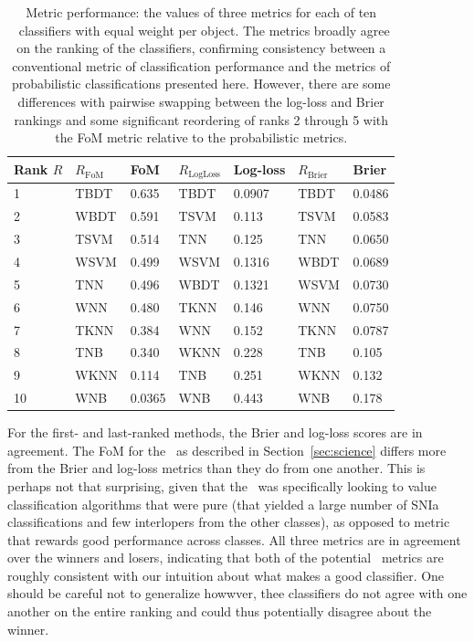 \begin{table}[]
	\begin{centering}
\begin{tabular}{lllllll}%
Rank $R$ & $R_\mathrm{FoM}$ & FoM & %
$R_\mathrm{LogLoss}$ & Log-loss & $R_\mathrm{Brier}$ & Brier \\
\hline
1  & TBDT & 0.635  %
& TBDT & 0.0907 & TBDT & 0.0486 \\
2  & WBDT & 0.591  %
& TSVM & 0.113  & TSVM & 0.0583 \\
3  & TSVM & 0.514  %
& TNN  & 0.125  & TNN  & 0.0650 \\
4  & WSVM & 0.499  %
& WSVM & 0.1316 & WBDT & 0.0689 \\
5  & TNN  & 0.496  %
& WBDT & 0.1321 & WSVM & 0.0730 \\
6  & WNN  & 0.480  %
& TKNN & 0.146  & WNN  & 0.0750 \\
7  & TKNN & 0.384  %
& WNN  & 0.152  & TKNN & 0.0787 \\
8  & TNB  & 0.340  %
& WKNN & 0.228  & TNB  & 0.105  \\
9  & WKNN & 0.114  %
& TNB  & 0.251  & WKNN & 0.132  \\
10 & WNB  & 0.0365 %
& WNB  & 0.443  & WNB  & 0.178  \\
\end{tabular}
	\caption{Metric performance: the values of three metrics for each of ten \snmachine\ classifiers with equal weight per object.
	The metrics broadly agree on the ranking of the classifiers, confirming consistency between a conventional metric of classification performance and the metrics of probabilistic classifications presented here.
	However, there are some differences with pairwise swapping between the log-loss and Brier rankings and some significant reordering of ranks 2 through 5 with the FoM metric relative to the probabilistic metrics.}
	\label{tab:snmachineresults}
	\end{centering}
\end{table}

For the first- and last-ranked methods, the Brier and log-loss scores are in agreement.
The FoM for the \snphotcc\, as described in Section~\ref{sec:science} differs more from the Brier and log-loss metrics than they do from one another. This is perhaps not that surprising, given that the \snphotcc\ was specifically looking to value classification algorithms that were pure (that yielded a large number of SNIa classifications and few interlopers from the other classes), as opposed to metric that rewards good performance across classes. All three metrics are in agreement over the winners and losers, indicating that both of the potential \plasticc\ metrics are roughly consistent with our intuition about what makes a good classifier. One should be careful not to generalize howwver, thee classifiers do not agree with one another on the entire ranking and could thus potentially disagree about the winner.
